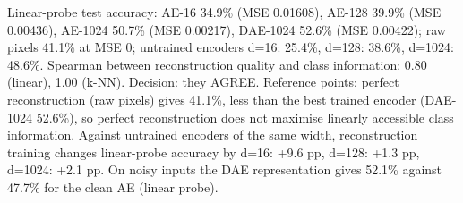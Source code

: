 Linear-probe test accuracy: AE-16 34.9\% (MSE 0.01608), AE-128 39.9\% (MSE 0.00436), AE-1024 50.7\% (MSE 0.00217), DAE-1024 52.6\% (MSE 0.00422); raw pixels 41.1\% at MSE 0; untrained encoders d=16: 25.4\%, d=128: 38.6\%, d=1024: 48.6\%. Spearman between reconstruction quality and class information: 0.80 (linear), 1.00 (k-NN). Decision: they AGREE. Reference points: perfect reconstruction (raw pixels) gives 41.1\%, less than the best trained encoder (DAE-1024 52.6\%), so perfect reconstruction does not maximise linearly accessible class information. Against untrained encoders of the same width, reconstruction training changes linear-probe accuracy by d=16: +9.6 pp, d=128: +1.3 pp, d=1024: +2.1 pp. On noisy inputs the DAE representation gives 52.1\% against 47.7\% for the clean AE (linear probe).
